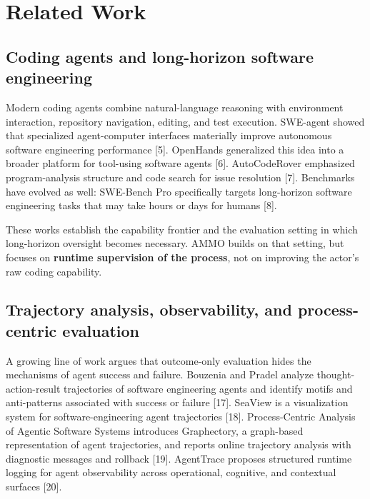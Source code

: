 \documentclass[11pt]{article}
\begin{document}
\section{Related Work}

\subsection{Coding agents and long-horizon software engineering}

Modern coding agents combine natural-language reasoning with environment interaction, repository navigation, editing, and test execution. SWE-agent showed that specialized agent-computer interfaces materially improve autonomous software engineering performance [5]. OpenHands generalized this idea into a broader platform for tool-using software agents [6]. AutoCodeRover emphasized program-analysis structure and code search for issue resolution [7]. Benchmarks have evolved as well: SWE-Bench Pro specifically targets long-horizon software engineering tasks that may take hours or days for humans [8].

These works establish the capability frontier and the evaluation setting in which long-horizon oversight becomes necessary. AMMO builds on that setting, but focuses on \textbf{runtime supervision of the process}, not on improving the actor's raw coding capability.

\subsection{Trajectory analysis, observability, and process-centric evaluation}

A growing line of work argues that outcome-only evaluation hides the mechanisms of agent success and failure. Bouzenia and Pradel analyze thought-action-result trajectories of software engineering agents and identify motifs and anti-patterns associated with success or failure [17]. SeaView is a visualization system for software-engineering agent trajectories [18]. Process-Centric Analysis of Agentic Software Systems introduces Graphectory, a graph-based representation of agent trajectories, and reports online trajectory analysis with diagnostic messages and rollback [19]. AgentTrace proposes structured runtime logging for agent observability across operational, cognitive, and contextual surfaces [20].
\end{document}
